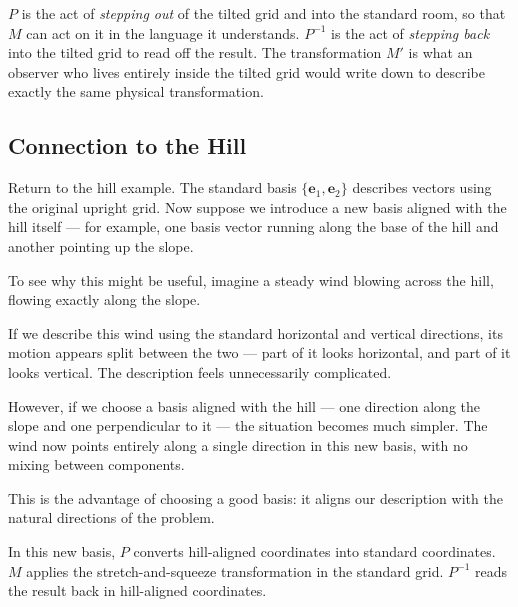 \documentclass[11pt,openany]{book}
\theoremstyle{definition}
\begin{document}
\medskip

$P$ is the act of \textit{stepping out} of the tilted grid and into the standard room,
so that $M$ can act on it in the language it understands. $P^{-1}$ is the act of
\textit{stepping back} into the tilted grid to read off the result. The transformation
$M'$ is what an observer who lives entirely inside the tilted grid would write down
to describe exactly the same physical transformation.


\subsection{Connection to the Hill}

Return to the hill example. The standard basis $\{\mathbf{e}_1, \mathbf{e}_2\}$
describes vectors using the original upright grid. Now suppose we introduce a new
basis aligned with the hill itself --- for example, one basis vector running along
the base of the hill and another pointing up the slope.

\medskip

To see why this might be useful, imagine a steady wind blowing across the hill,
flowing exactly along the slope.

\medskip

If we describe this wind using the standard horizontal and vertical directions,
its motion appears split between the two --- part of it looks horizontal, and part
of it looks vertical. The description feels unnecessarily complicated.

\medskip

However, if we choose a basis aligned with the hill --- one direction along the slope
and one perpendicular to it --- the situation becomes much simpler. The wind now points
entirely along a single direction in this new basis, with no mixing between components.

\medskip

This is the advantage of choosing a good basis: it aligns our description with the
natural directions of the problem.

\medskip

In this new basis, $P$ converts hill-aligned coordinates into standard coordinates.
$M$ applies the stretch-and-squeeze transformation in the standard grid. $P^{-1}$
reads the result back in hill-aligned coordinates.
\end{document}
